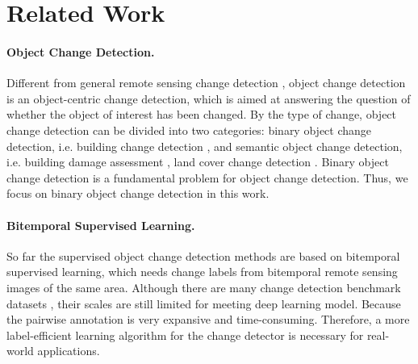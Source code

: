\documentclass[10pt,twocolumn,letterpaper]{article}
\begin{document}
\section{Related Work}
\label{sec:related_work}


\paragraph{Object Change Detection.}
Different from general remote sensing change detection \cite{singh1989review}, object change detection is an object-centric change detection, which is aimed at answering the question of whether the object of interest has been changed. 
By the type of change, object change detection can be divided into two categories: binary object change detection, i.e. building change detection \cite{ji2018fully, chen2020spatial}, and semantic object change detection, i.e. building damage assessment \cite{gupta2019creating}, land cover change detection \cite{tian2020hiucd}.
Binary object change detection is a fundamental problem for object change detection.
Thus, we focus on binary object change detection in this work.

\vspace{-0.2in}
\paragraph{Bitemporal Supervised Learning.}
So far the supervised object change detection methods are based on bitemporal supervised learning, which needs change labels from bitemporal remote sensing images of the same area.
Although there are many change detection benchmark datasets \cite{benedek2009change,bourdis2011constrained,fujita2017damage, lebedev2018change, ji2018fully, daudt2018urban, daudt2019multitask, chen2020spatial, tian2020hiucd}, their scales are still limited for meeting deep learning model.
Because the pairwise annotation is very expansive and time-consuming.
Therefore, a more label-efficient learning algorithm for the change detector is necessary for real-world applications.

\vspace{-0.2in}
\end{document}
